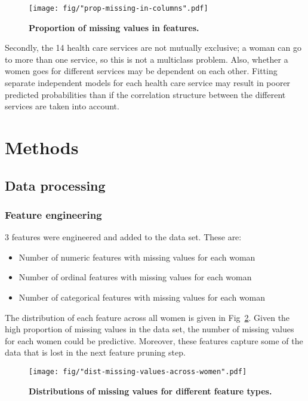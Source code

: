 \documentclass{article}\usepackage[]{graphicx}\usepackage[]{color}
\begin{document}
\begin{figure}[htbp]
\begin{center}
\texttt{[image: fig/"prop-missing-in-columns".pdf]}
\caption{\textbf{Proportion of missing values in features.}}
\label{fig-missing}
\end{center}
\end{figure}

Secondly, the 14 health care services are not mutually exclusive; a woman can go to more than one service, so this is not a multiclass problem. Also, whether a women goes for different services may be dependent on each other. Fitting separate independent models for each health care service may result in poorer predicted probabilities than if the correlation structure between the different services are taken into account.
  \section{Methods}
\label{sec:methods}

\subsection{Data processing}
\subsubsection{Feature engineering}
3 features were engineered and added to the data set. These are:
  \begin{itemize}
\item Number of numeric features with missing values for each woman
\item Number of ordinal features with missing values for each woman
\item Number of categorical features with missing values for each woman
\end{itemize}

The distribution of each feature across all women is given in Fig~\ref{fig-feature-engin}. Given the high proportion of missing values in the data set, the number of missing values for each women could be predictive. Moreover, these features capture some of the data that is lost in the next feature pruning step.

\begin{figure}[htbp]
\begin{center}
\texttt{[image: fig/"dist-missing-values-across-women".pdf]}
\caption{\textbf{Distributions of missing values for different feature types.}}
\label{fig-feature-engin}
\end{center}
\end{figure}
\end{document}
